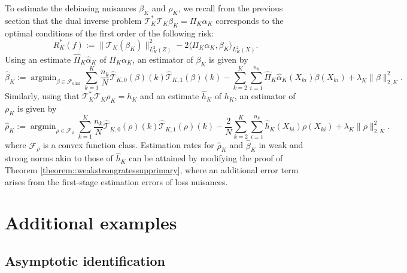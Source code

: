 \documentclass[11pt]{article}
\theoremstyle{plain}
\theoremstyle{definition}
\theoremstyle{remark}
\theoremstyle{definition}
\DeclareMathOperator*{\argmin}{argmin}
\begin{document}
 
To estimate the debiasing nuisances $\beta_K$ and $\rho_K$, we recall from the previous section that the dual inverse problem $\mathcal{T}_K^* \mathcal{T}_K \beta_K = \Pi_K \alpha_K$ corresponds to the optimal conditions of the first order of the following risk:
\[
R_K^*(f) := \|\mathcal{T}_{K}(\beta_K)\|^2_{L^2_K(Z)} -2 \langle \Pi_K \alpha_K , \beta_K \rangle_{L^2_K(X)}.
\]
Using an estimate $\widehat{\Pi}_K\widehat{\alpha}_K$ of $\Pi_K \alpha_K$, an estimator of $\beta_K$ is given by
\[
\widehat{\beta}_K := \argmin_{\beta \in \mathcal{F}_{\mathrm{dual}}} \sum_{k=1}^K \frac{n_k}{N} \widehat{\mathcal{T}}_{K,0}(  \beta)(k)\widehat{\mathcal{T}}_{K,1}(  \beta)(k) - \sum_{k=2}^K \sum_{i=1}^{n_k} \widehat{\Pi}_K\widehat{\alpha}_K(X_{ki})\beta(X_{ki}) + \lambda_K \|\beta\|_{2, K}^2.
\]
Similarly, using that $\mathcal{T}_K^* \mathcal{T}_K \rho_K = h_K$ and an estimate $ \widehat{h}_K$ of $h_K$, an estimator of $\rho_K$ is given by
\[
\widehat{\rho}_K := \argmin_{\rho \in \mathcal{F}_{\rho}} \sum_{k=1}^K \frac{n_k}{N} \widehat{\mathcal{T}}_{K,0}(  \rho)(k)\widehat{\mathcal{T}}_{K,1}(  \rho)(k) -\frac{2}{N}\sum_{k=2}^K \sum_{i=1}^{n_k} \widehat{h}_K(X_{ki})\rho(X_{ki}) + \lambda_K \|\rho\|_{2, K}^2.
\]
where $\mathcal{F}_{\rho}$ is a convex function class. Estimation rates for $\widehat{\rho}_K $ and $\widehat{\beta}_K$ in weak and strong norms akin to those of $\widehat{h}_K$ can be attained by modifying the proof of Theorem \ref{theorem::weakstrongratessupprimary}, where an additional error term arises from the first-stage estimation errors of loss nuisances.


 

 
\section{Additional examples}

\subsection{Asymptotic identification}
\end{document}
